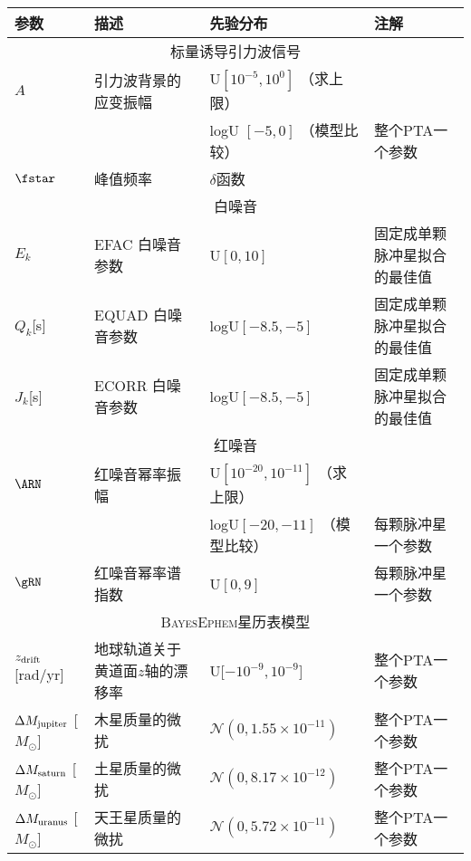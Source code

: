 \begin{table}[htb!]
    {
    \scriptsize
    \begin{tabular}{llll}
        \hline\hline
        参数 & 描述 & 先验分布 & 注解 \\
        \hline
        \multicolumn{4}{c}{标量诱导引力波信号} \\[1pt]
        $A$ & 引力波背景的应变振幅 & U$[10^{-5}, 10^{0}]$ （求上限） & \\
        & & logU $[-5, 0]$ （模型比较） & 整个PTA一个参数 \\
        $\fstar$ & 峰值频率 & $\delta$函数  &  \\
        \hline
        \multicolumn{4}{c}{白噪音} \\[1pt]
        $E_{k}$ & EFAC 白噪音参数 & U$[0, 10]$ & 固定成单颗脉冲星拟合的最佳值 \\
        $Q_{k}$[s] & EQUAD 白噪音参数 & logU$[-8.5, -5]$ & 固定成单颗脉冲星拟合的最佳值 \\
        $J_{k}$[s] & ECORR 白噪音参数 & logU$[-8.5, -5]$ & 固定成单颗脉冲星拟合的最佳值 \\
        \hline
        \multicolumn{4}{c}{红噪音} \\[1pt]
        $\ARN$ & 红噪音幂率振幅 & U$[10^{-20}, 10^{-11}]$ （求上限） & \\
        & & logU$[-20, -11]$ （模型比较）  & 每颗脉冲星一个参数 \\
        $\gRN$ & 红噪音幂率谱指数 & U$[0, 9]$ & 每颗脉冲星一个参数 \\
        \hline
        \multicolumn{4}{c}{\textsc{BayesEphem}星历表模型} \\[1pt]
        $z_{\rm drift}$ [rad/yr] & 地球轨道关于黄道面$z$轴的漂移率 & U[$-10^{-9}, 10^{-9}$] & 整个PTA一个参数 \\
        $\Delta M_{\rm jupiter}$ [$M_{\odot}$] & 木星质量的微扰 & $\mathcal{N}(0, 1.55\times 10^{-11})$  & 整个PTA一个参数 \\
        $\Delta M_{\rm saturn}$ [$M_{\odot}$] & 土星质量的微扰 & $\mathcal{N}(0, 8.17\times 10^{-12})$  & 整个PTA一个参数 \\
        $\Delta M_{\rm uranus}$ [$M_{\odot}$] & 天王星质量的微扰 & $\mathcal{N}(0, 5.72\times 10^{-11})$  & 整个PTA一个参数 \\

\end{tabular}}
\end{table}
